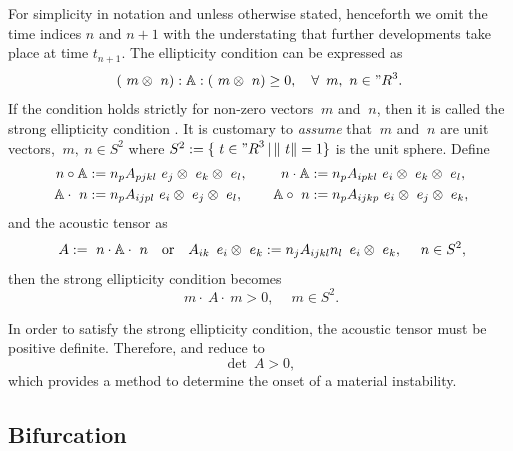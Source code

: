 \documentclass[12pt]{article}
\numberwithin{equation}{section}
\begin{document}
For simplicity in notation and unless otherwise stated, henceforth we
omit the time indices $n$ and $n+1$ with the understating that further
developments take place at time $t_{n+1}$.  The ellipticity condition
can be expressed as
\begin{equation} \label{eq:strong-ellipticity}
  (~m \otimes ~n) : \mathbb{A} : (~m \otimes ~n) \ge 0,
  \quad
  \forall \, ~m, ~n \in {"R}^3.
\end{equation}
If the condition holds strictly for non-zero vectors $~m$ and $~n$,
then it is called the strong ellipticity condition
\citep{Hadamard:1903, Truesdell.Noll:2004, Miehe.etal:2004}. It is
customary to \emph{assume} that $~m$ and $~n$ are unit vectors, \ie
$~m, ~n \in S^2$ where $S^2 := \{ ~t \in {"R}^3 \, | \, \| ~t \| =
1\}$ is the unit sphere. Define
\begin{equation} \label{eq:dot-products}
  \begin{aligned}
    ~n \circ \mathbb{A} & := n_p A_{pjkl} ~e_j \otimes ~e_k \otimes ~e_l,
    \quad &
    ~n \cdot \mathbb{A} & := n_p A_{ipkl} ~e_i \otimes ~e_k \otimes ~e_l,
    \\
    \mathbb{A} \cdot ~n & := n_p A_{ijpl} ~e_i \otimes ~e_j \otimes ~e_l,
    \quad &
    \mathbb{A} \circ ~n & := n_p A_{ijkp} ~e_i \otimes ~e_j \otimes ~e_k,
  \end{aligned}
\end{equation}
and the acoustic tensor as
\begin{equation} \label{eq:acoustic-tensor}
  ~A := ~n \cdot \mathbb{A} \cdot ~n
  \quad \text{or} \quad
  A_{ik} \, ~e_i \otimes ~e_k := n_j A_{ijkl} n_l \, ~e_i \otimes ~e_k,
  \quad
  ~n \in S^2,
\end{equation}
then the strong ellipticity condition becomes
\begin{equation} \label{eq:acoustic-ellipticity}
  ~m \cdot ~A \cdot ~m > 0, \quad ~m \in S^2.
\end{equation}

In order to satisfy the strong ellipticity condition, the acoustic
tensor must be positive definite. Therefore,
 and  reduce
to
\begin{equation} \label{eq:acoustic-determinant}
  \det ~A > 0,
\end{equation}
which provides a method to determine the onset of a material
instability.

\subsection{Bifurcation}
\end{document}
